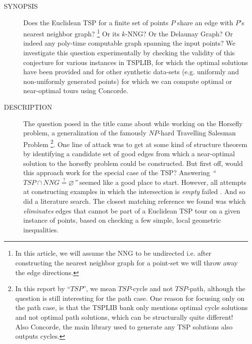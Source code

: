 \vspace{5mm}
\begin{description}
  \item[SYNOPSIS] Does the Euclidean TSP for a finite set of points $P$ share an edge with $P$'s nearest neighbor graph? \footnote{In this article, we will assume the NNG to be undirected i.e. after constructing the nearest neighbor graph for a point-set we will throw away the edge directions.}
     Or its $k$-NNG? Or the Delaunay Graph? 
     Or indeed any poly-time computable graph spanning the input points? We investigate
     this question experimentally by checking the validity of this conjecture for  
     various instances  in TSPLIB, for which the optimal solutions
     have been provided and for other synthetic data-sets (e.g. uniformly and non-uniformly generated points)
     for which we can compute optimal or near-optimal tours using Concorde. 
                   
  \item[DESCRIPTION] The question posed in the title came about while working on the Horsefly problem, 
     a generalization of the famously $NP$-hard Travelling Salesman Problem \footnote{In this report by ``$TSP$'', we mean $TSP$-cycle and not $TSP$-path, although the question is still interesting for the path case. One reason for focusing only on the path case, is that the TSPLIB bank only mentions optimal cycle solutions and not optimal path solutions, which can be structurally quite different! Also Concorde, the main library used to generate any TSP solutions also outputs cycles.}. 
     One line of attack was to get at some kind of structure theorem by identifying  a candidate set of good edges from which a near-optimal solution to the 
     horsefly problem could be constructed. But first off, would this approach work for the special case of the  TSP?  Answering
     \textit{``$TSP \cap NNG \stackrel{?}{=} \varnothing$''} seemed like a good place to start.  However, all attempts  
     at constructing examples in which the intersection is \textit{empty} failed . And so did a
     literature search. The closest matching reference we found was \cite{hougardy2014edge} which \textit{eliminates} edges 
     that cannot be part of a Euclidean TSP tour on a given instance of points, based on checking a few simple, local geometric inequalities. 


\end{description}
